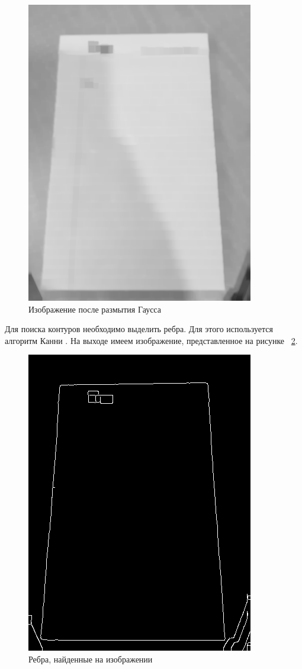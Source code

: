 \begin{figure}
    \includegraphics[scale=0.25]{img/perspective/blured.png}
    \caption{Изображение после размытия Гаусса}
    \label{gauss_blur}
\end{figure}

Для поиска контуров необходимо выделить ребра. Для этого используется алгоритм Канни \cite{canny}. На выходе имеем изображение, представленное на рисунке ~\ref{canny}.
\begin{figure}
    \includegraphics[scale=0.25]{img/perspective/canny.png}
    \caption{Ребра, найденные на изображении}
    \label{canny}
\end{figure}

